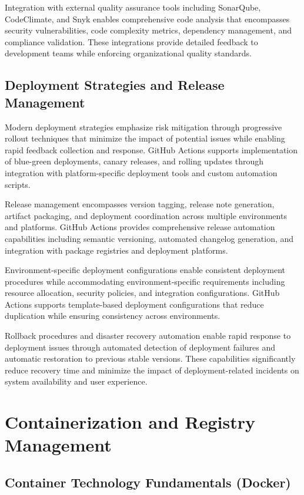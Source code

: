 Integration with external quality assurance tools including SonarQube, CodeClimate, and Snyk enables comprehensive code analysis that encompasses security vulnerabilities, code complexity metrics, dependency management, and compliance validation. These integrations provide detailed feedback to development teams while enforcing organizational quality standards.

\subsection{Deployment Strategies and Release Management}

Modern deployment strategies emphasize risk mitigation through progressive rollout techniques that minimize the impact of potential issues while enabling rapid feedback collection and response. GitHub Actions supports implementation of blue-green deployments, canary releases, and rolling updates through integration with platform-specific deployment tools and custom automation scripts.

Release management encompasses version tagging, release note generation, artifact packaging, and deployment coordination across multiple environments and platforms. GitHub Actions provides comprehensive release automation capabilities including semantic versioning, automated changelog generation, and integration with package registries and deployment platforms.

Environment-specific deployment configurations enable consistent deployment procedures while accommodating environment-specific requirements including resource allocation, security policies, and integration configurations. GitHub Actions supports template-based deployment configurations that reduce duplication while ensuring consistency across environments.

Rollback procedures and disaster recovery automation enable rapid response to deployment issues through automated detection of deployment failures and automatic restoration to previous stable versions. These capabilities significantly reduce recovery time and minimize the impact of deployment-related incidents on system availability and user experience.

\section{Containerization and Registry Management}

\subsection{Container Technology Fundamentals (Docker)}

